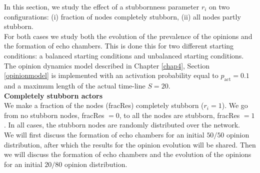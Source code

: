 \documentclass[11 pt , letterpaper , twoside , openright]{book}
\begin{document}
In this section, we study the effect of a stubbornness parameter $r_i$ on two configurations: (i) fraction of nodes completely stubborn, (ii) all nodes partly stubborn.\\
\newline
For both cases we study both the evolution of the prevalence of the opinions and the formation of echo chambers. This is done this for two different starting conditions: a balanced starting conditions and unbalanced starting conditions. \\
\newline
The opinion dynamics model described in Chapter \ref{chap4}, Section \ref{opinionmodel} is implemented with an activation probability equal to $p_{\text{act}} = 0.1$ and a maximum length of the actual time-line $S = 20$.\\
\newline
\textbf{Completely stubborn actors}\\
\newline
We make a fraction of the nodes (fracRes) completely stubborn ($r_i = 1$). We go from no stubborn nodes, fracRes $=0$, to all the nodes are stubborn, fracRes $=1$. In all cases, the stubborn nodes are randomly distributed over the network.\\
\newline
We will first discuss the formation of echo chambers for an initial $50/50$ opinion distribution, after which the results for the opinion evolution will be shared. Then we will discuss the formation of echo chambers and the evolution of the opinions for an initial $20/80$ opinion distribution.
\end{document}

